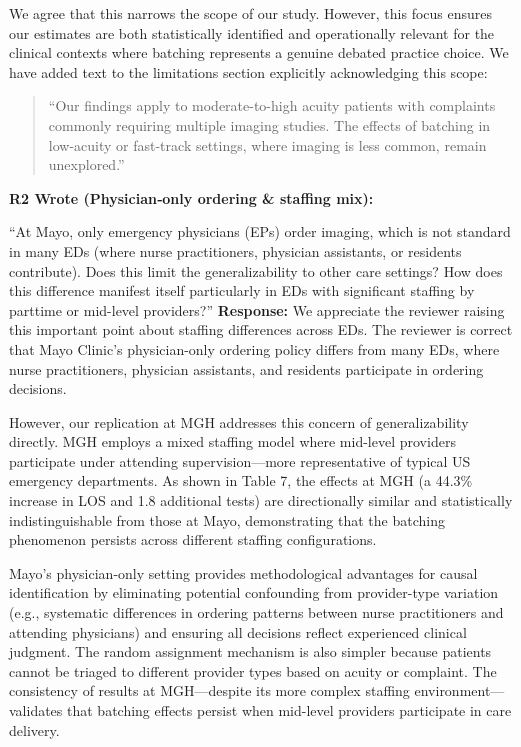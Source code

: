 \documentclass[11pt]{article}
\newenvironment{quote2}
{ \bigskip
\noindent
         \small\em
         \baselineskip=14pt
}
\newcommand{\1}{\hbox{\rm 1\kern-.35em 1}}
\begin{document}
We agree that this narrows the scope of our study. However, this focus ensures our estimates are both statistically identified and operationally relevant for the clinical contexts where batching represents a genuine debated practice choice. We have added text to the limitations section explicitly acknowledging this scope:

\begin{quote}
``Our findings apply to moderate-to-high acuity patients with complaints commonly requiring multiple imaging studies. The effects of batching in low-acuity or fast-track settings, where imaging is less common, remain unexplored.''
\end{quote}


\color{black}

\begin{quote2}
\textbf{R2 Wrote (Physician‑only ordering \& staffing mix):}  

\noindent``At Mayo, only emergency physicians (EPs) order imaging, which is not standard in many EDs (where nurse practitioners, physician assistants, or residents contribute). Does this limit the generalizability to other care settings? How does this difference manifest itself particularly in EDs with significant staffing by parttime or mid-level providers?'' 
\end{quote2}

\noindent\textbf{Response:} \color{blue}We appreciate the reviewer raising this important point about staffing differences across EDs. The reviewer is correct that Mayo Clinic's physician-only ordering policy differs from many EDs, where nurse practitioners, physician assistants, and residents participate in ordering decisions.

However, our replication at MGH addresses this concern of generalizability directly. MGH employs a mixed staffing model where mid-level providers participate under attending supervision—more representative of typical US emergency departments. As shown in Table 7, the effects at MGH (a 44.3\% increase in LOS and 1.8 additional tests) are directionally similar and statistically indistinguishable from those at Mayo, demonstrating that the batching phenomenon persists across different staffing configurations.

Mayo's physician-only setting provides methodological advantages for causal identification by eliminating potential confounding from provider-type variation (e.g., systematic differences in ordering patterns between nurse practitioners and attending physicians) and ensuring all decisions reflect experienced clinical judgment. The random assignment mechanism is also simpler because patients cannot be triaged to different provider types based on acuity or complaint. The consistency of results at MGH—despite its more complex staffing environment—validates that batching effects persist when mid-level providers participate in care delivery.
\end{document}
